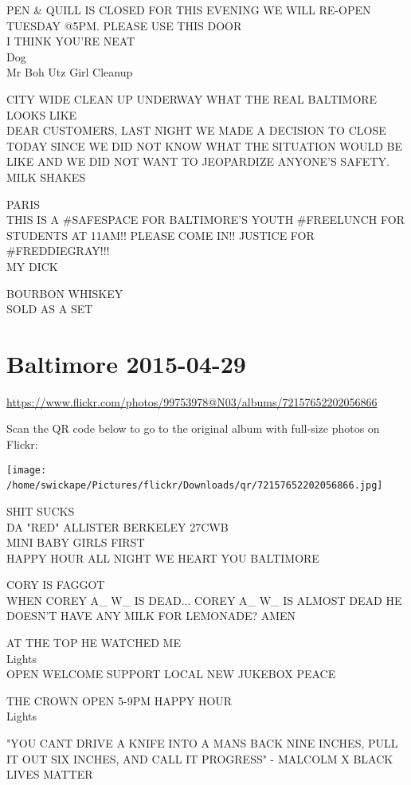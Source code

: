 \documentclass[10pt,letterpaper]{article}
\begin{document}
PEN \& QUILL IS CLOSED FOR THIS EVENING WE WILL RE{-}OPEN TUESDAY @5PM.  PLEASE USE THIS DOOR\\
I THINK YOU'RE NEAT\\
Dog\\
Mr Boh Utz Girl Cleanup

CITY WIDE CLEAN UP UNDERWAY WHAT THE REAL BALTIMORE LOOKS LIKE\\
DEAR CUSTOMERS, LAST NIGHT WE MADE A DECISION TO CLOSE TODAY SINCE WE DID NOT KNOW WHAT THE SITUATION WOULD BE LIKE AND WE DID NOT WANT TO JEOPARDIZE ANYONE'S SAFETY.\\
MILK SHAKES

PARIS\\
THIS IS A \#SAFESPACE FOR BALTIMORE'S YOUTH \#FREELUNCH FOR STUDENTS AT 11AM!!  PLEASE COME IN!!  JUSTICE FOR \#FREDDIEGRAY!!!\\
MY DICK

BOURBON WHISKEY\\
SOLD AS A SET
\

\section*{Baltimore 2015-04-29}

\url{https://www.flickr.com/photos/99753978@N03/albums/72157652202056866}

Scan the QR code below to go to the original album with full-size photos on Flickr:

\texttt{[image: /home/swickape/Pictures/flickr/Downloads/qr/72157652202056866.jpg]}
\

SHIT SUCKS\\
DA "RED" ALLISTER BERKELEY 27CWB\\
MINI BABY GIRLS FIRST\\
HAPPY HOUR ALL NIGHT WE HEART YOU BALTIMORE

CORY IS FAGGOT\\
WHEN COREY A\_ W\_ IS DEAD...  COREY A\_ W\_ IS ALMOST DEAD HE DOESN'T HAVE ANY MILK FOR LEMONADE?  AMEN

AT THE TOP HE WATCHED ME\\
Lights\\
OPEN WELCOME SUPPORT LOCAL NEW JUKEBOX PEACE

THE CROWN OPEN 5{-}9PM HAPPY HOUR\\
Lights

"YOU CANT DRIVE A KNIFE INTO A MANS BACK NINE INCHES, PULL IT OUT SIX INCHES, AND CALL IT PROGRESS" {-} MALCOLM X BLACK LIVES MATTER
\
\end{document}
